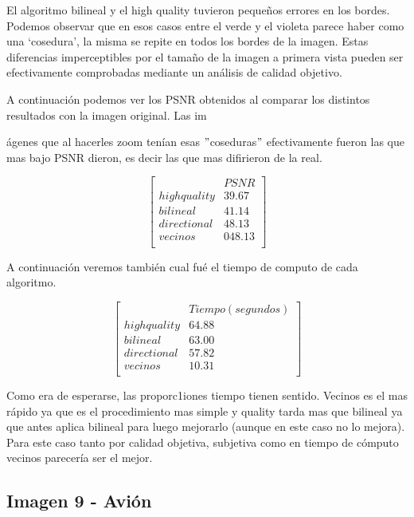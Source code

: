 El algoritmo bilineal y el high quality tuvieron pequeños errores en los bordes. Podemos observar que en esos casos entre el verde y el violeta parece haber como una `cosedura', la misma se repite en todos los bordes de la imagen. Estas diferencias imperceptibles por el tamaño de la imagen a primera vista pueden ser efectivamente comprobadas mediante un análisis de calidad objetivo. 

A continuación podemos ver los PSNR obtenidos al comparar los distintos resultados con la imagen original. Las im{ágenes que al hacerles zoom tenían esas $"$coseduras$"$ efectivamente fueron las que mas bajo PSNR dieron, es decir las que mas difirieron de la real.

$$ 
\begin{bmatrix}
           &      PSNR     \\
       highquality    &   39.67   \\
       bilineal    &      41.14   \\
       directional    &      48.13    \\
       vecinos   &      048.13      \\
\end{bmatrix} 
$$

A continuación veremos también cual fué el tiempo de computo de cada algoritmo.

$$ 
\begin{bmatrix}
           &      Tiempo (segundos)     \\
       highquality    &   64.88   \\
       bilineal    &      63.00   \\
       directional    &      57.82    \\
       vecinos   &      10.31      \\
\end{bmatrix} 
$$

Como era de esperarse, las proporc1iones tiempo tienen sentido. Vecinos es el mas rápido ya que es el procedimiento mas simple y quality tarda mas que bilineal ya que antes aplica bilineal para luego mejorarlo (aunque en este caso no lo mejora). Para este caso tanto por calidad objetiva, subjetiva como en tiempo de cómputo vecinos parecería ser el mejor.


\newpage

\subsection{Imagen 9 - Avión}

}
